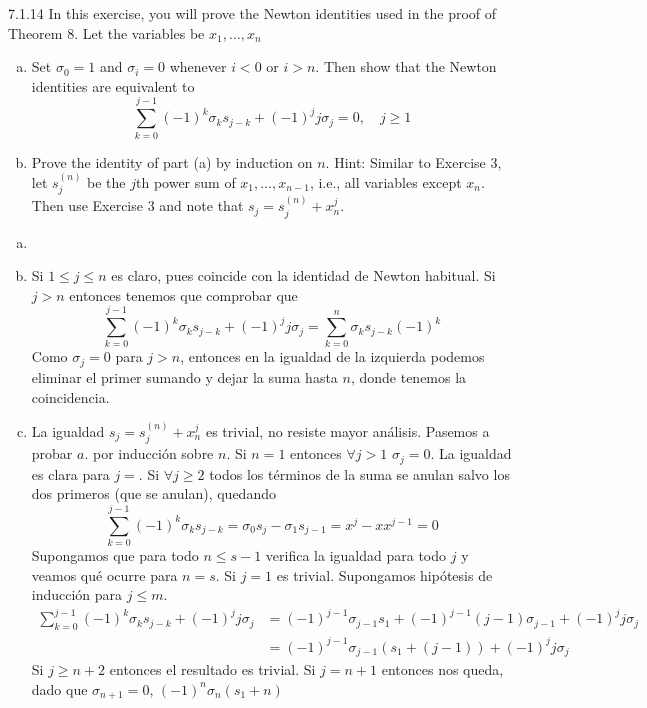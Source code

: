 \documentclass[twoside]{article}
\begin{document}
\begin{ejercicio}{7.1.14}
In this exercise, you will prove the Newton identities used in the proof of Theorem 8. Let the variables be $x_1,\dotsc,x_n$
\begin{enumerate}[a.]
\item Set $σ_0 = 1$ and $σ_i = 0$ whenever $i < 0$ or $i > n$. Then show that the Newton identities are equivalent to
$$
\sum_{k=0}^{j-1} (-1)^{k}\sigma_{k}s_{j-k} + (-1)^j j \sigma_j = 0, \quad j\geq 1 
$$
\item Prove the identity of part (a) by induction on $n$. Hint: Similar to Exercise 3, let $s^{(n)}_j$ be
the $j$th power sum of $x_1,\dotsc,x_{n-1}$, i.e., all variables except $x_n$. Then use Exercise 3 and note that $s_j = s^{(n)}_j+x_n^j$.
\end{enumerate} 
\end{ejercicio}
\begin{solucion}
\begin{enumerate}[a.]
\item[]
\item Si $1\leq j \leq n$ es claro, pues coincide con la identidad de Newton habitual. Si $j>n$ entonces tenemos que comprobar que
$$
\sum_{k=0}^{j-1} (-1)^{k}\sigma_{k}s_{j-k} + (-1)^j j \sigma_j  = \sum_{k=0}^n \sigma_k s_{j-k}(-1)^k
$$
Como $\sigma_j=0$ para $j>n$, entonces en la igualdad de la izquierda podemos eliminar el primer sumando y dejar la suma hasta $n$, donde tenemos la coincidencia.  
\item La igualdad $s_j = s_j^{(n)} + x^j_n$ es trivial, no resiste mayor análisis. Pasemos a probar $a.$ por inducción sobre $n$. Si $n = 1$ entonces $\forall j >1$ $\sigma_j =0$. La igualdad es clara para $j=$. Si $\forall j \geq 2$ todos los términos de la suma se anulan salvo los dos primeros (que se anulan), quedando
$$
\sum_{k=0}^{j-1} (-1)^{k}\sigma_{k}s_{j-k} = \sigma_0 s_j - \sigma_1 s_{j-1} = x^j - x x^{j-1} = 0
$$
Supongamos que para todo $n\leq s-1$ verifica la igualdad para todo $j$ y veamos qué ocurre para $n=s$. Si $j=1$ es trivial. Supongamos hipótesis de inducción para $j\leq m$.
\begin{align*}
\sum_{k=0}^{j-1} (-1)^{k}\sigma_{k}s_{j-k} + (-1)^j j \sigma_j   &= (-1)^{j-1}\sigma_{j-1}s_1 + (-1)^{j-1}(j-1)\sigma_{j-1}+(-1)^j j \sigma_j\\
&=(-1)^{j-1}\sigma_{j-1}(s_1 + (j-1))+(-1)^j j \sigma_j
\end{align*}
Si $j\geq n+2$ entonces el resultado es trivial. Si $j=n+1$ entonces nos queda, dado que $\sigma_{n+1}=0$, $(-1)^n\sigma_n (s_1+n)$
\end{enumerate}
\end{solucion}
\end{document}

